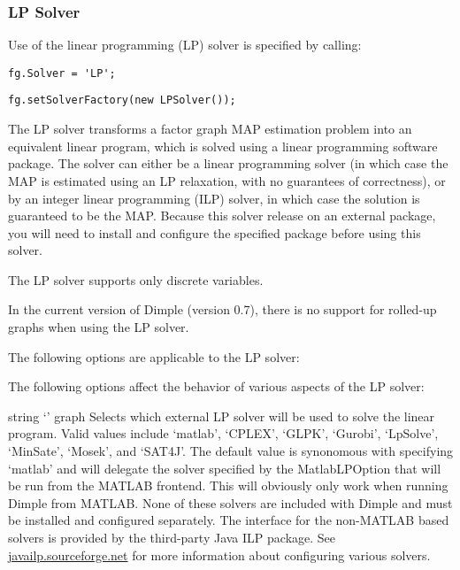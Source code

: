 \clearpage
\subsubsection{LP Solver}
\label{sec:LPSolver}

Use of the linear programming (LP) solver is specified by calling:

\ifmatlab
\begin{lstlisting}
fg.Solver = 'LP';
\end{lstlisting}
\fi
\ifjava
\begin{lstlisting}
fg.setSolverFactory(new LPSolver());
\end{lstlisting}
\fi

The LP solver transforms a factor graph MAP estimation problem into an equivalent linear program, which is solved using a linear programming software package. The solver can either be a linear programming solver (in which case the MAP is estimated using an LP relaxation, with no guarantees of correctness), or by an integer linear programming (ILP) solver, in which case the solution is guaranteed to be the MAP. Because this solver release on an external package, you will need to install and configure the specified package before using this solver.

The LP solver supports only discrete variables.

In the current version of Dimple (version 0.7), there is no support for rolled-up graphs when using the LP solver.

The following options are applicable to the LP solver:


The following options affect the behavior of various aspects of the LP solver:


{string}
{`'}
{graph}
{Selects which external LP solver will be used to solve the linear program. Valid values include `matlab', `CPLEX', `GLPK', `Gurobi', `LpSolve', `MinSate', `Mosek', and `SAT4J'. The default value is synonomous with specifying `matlab' and will delegate the solver specified by the MatlabLPOption that will be run from the MATLAB frontend. This will obviously only work when running Dimple from MATLAB. None of these solvers are included with Dimple and must be installed and configured separately. The interface for the non-MATLAB based solvers is provided by the third-party Java ILP package. See \href{http://javailp.sourceforge.net}{javailp.sourceforge.net} for more information about configuring various solvers.}

